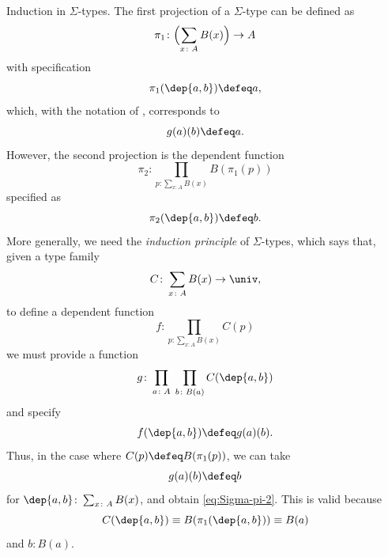 \begin{lpar}{Induction in $\Sigma$-types.}\label{lpar:Sigma-induction}
    The first projection of a $\Sigma$-type can be defined as
    \[
        \pi_1\colon\Bigl(\sum_{x\colon A}B(x)\Bigr)
            \to A
    \]
    with specification
    \[
        \pi_1(\dep{a,b})\defeq a,
    \]
    which, with the notation of , corresponds to
    \[
        g(a)(b) \defeq a.
    \]
    However, the second projection is the dependent function
    \begin{equation}\label{eq:Sigma-pi-2}
        \pi_2\colon\prod_{p\colon\sum_{x\colon A}B(x)}B(\pi_1(p))
    \end{equation}
    specified as
    \[
        \pi_2(\dep{a,b}) \defeq b.
    \]
    More generally, we need the \textsl{induction principle} of $\Sigma$-types, which says that, given a type family
    \[
        C\colon\sum_{x\colon A}B(x)\to\univ,
    \]
    to define a dependent function
    \[
        f\colon\prod_{p\colon\sum_{x\colon A}
            B(x)}\!\!\!\!\!C(p)
    \]
    we must provide a function
    \[
        g\colon\prod_{a\colon A}\;\prod_{b\colon B(a)}
            C(\dep{a,b})
    \]
    and specify
    \[
        f(\dep{a,b})\defeq g(a)(b).
    \]
    Thus, in the case where $C(p) \defeq B(\pi_1(p))$, we can take
    \[
        g(a)(b) \defeq b
    \]
    for $\dep{a,b}\colon\sum_{x\colon A}B(x)$, and obtain \eqref{eq:Sigma-pi-2}. This is valid because
    \[
        C(\dep{a,b})\equiv B(\pi_1(\dep{a,b}))\equiv B(a)
    \]
    and $b\colon B(a)$.
\end{lpar}

